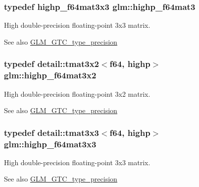 \subsubsection[{\texorpdfstring{highp\+\_\+f64mat3}{highp_f64mat3}}]{\setlength{\rightskip}{0pt plus 5cm}typedef highp\+\_\+f64mat3x3 {\bf glm\+::highp\+\_\+f64mat3}}\hypertarget{group__gtc__type__precision_ga00c5743b0eba6b437422571f4eda27b8}{}\label{group__gtc__type__precision_ga00c5743b0eba6b437422571f4eda27b8}
High double-\/precision floating-\/point 3x3 matrix. \begin{DoxySeeAlso}{See also}
\hyperlink{group__gtc__type__precision}{G\+L\+M\+\_\+\+G\+T\+C\+\_\+type\+\_\+precision} 
\end{DoxySeeAlso}
\subsubsection[{\texorpdfstring{highp\+\_\+f64mat3x2}{highp_f64mat3x2}}]{\setlength{\rightskip}{0pt plus 5cm}typedef detail\+::tmat3x2$<$f64, highp$>$ {\bf glm\+::highp\+\_\+f64mat3x2}}\hypertarget{group__gtc__type__precision_ga5cdc9d6fb9ce07e5485c4e2db919ce7e}{}\label{group__gtc__type__precision_ga5cdc9d6fb9ce07e5485c4e2db919ce7e}
High double-\/precision floating-\/point 3x2 matrix. \begin{DoxySeeAlso}{See also}
\hyperlink{group__gtc__type__precision}{G\+L\+M\+\_\+\+G\+T\+C\+\_\+type\+\_\+precision} 
\end{DoxySeeAlso}
\subsubsection[{\texorpdfstring{highp\+\_\+f64mat3x3}{highp_f64mat3x3}}]{\setlength{\rightskip}{0pt plus 5cm}typedef detail\+::tmat3x3$<$f64, highp$>$ {\bf glm\+::highp\+\_\+f64mat3x3}}\hypertarget{group__gtc__type__precision_gaf520a9307867c632408029a53af3e375}{}\label{group__gtc__type__precision_gaf520a9307867c632408029a53af3e375}
High double-\/precision floating-\/point 3x3 matrix. \begin{DoxySeeAlso}{See also}
\hyperlink{group__gtc__type__precision}{G\+L\+M\+\_\+\+G\+T\+C\+\_\+type\+\_\+precision} 
\end{DoxySeeAlso}
